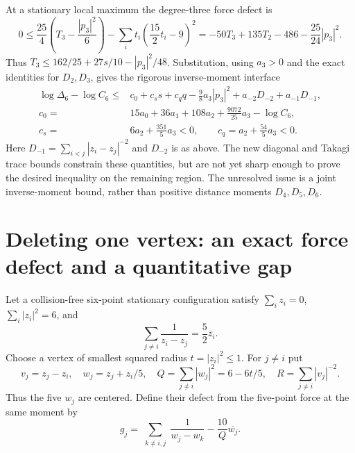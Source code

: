 \documentclass[11pt]{article}
\theoremstyle{remark}
\numberwithin{equation}{section}
\begin{document}
At a stationary local maximum the degree-three force defect is
\[
 0\le\frac{25}{4}\left(T_3-\frac{|p_3|^2}{6}\right)
       -\sum_i t_i\left(\frac{15}{2}t_i-9\right)^2
 =-50T_3+135T_2-486-\frac{25}{24}|p_3|^2.
\]
Thus $T_3\le162/25+27s/10-|p_3|^2/48$.
Substitution, using $a_3>0$ and the exact identities for $D_2,D_3$,
gives the rigorous inverse-moment interface
\begin{align*}
 \log\Delta_6-\log C_6\le{}& c_0+c_s s+c_q q
       -\frac98a_3|p_3|^2+a_{-2}D_{-2}+a_{-1}D_{-1},\\
 c_0={}&15a_0+36a_1+108a_2+\frac{9072}{25}a_3-\log C_6,\\
 c_s={}&6a_2+\frac{351}{5}a_3<0,\qquad
 c_q=a_2+\frac{54}{5}a_3<0.
\end{align*}
Here $D_{-1}=\sum_{i<j}|z_i-z_j|^{-2}$ and $D_{-2}$ is as above.
The new diagonal and Takagi trace bounds constrain these quantities,
but are not yet sharp enough to prove the desired inequality on the
remaining region. The unresolved issue is a joint inverse-moment
bound, rather than positive distance moments $D_4,D_5,D_6$.

\section{Deleting one vertex: an exact force defect and a quantitative gap}
\label{sec:noorigin-six-centroid}

Let a collision-free six-point stationary configuration satisfy
$\sum_i z_i=0$, $\sum_i|z_i|^2=6$, and
\[
 \sum_{j\ne i}\frac1{z_i-z_j}=\frac52\overline{z_i}.
\]
Choose a vertex of smallest squared radius $t=|z_i|^2\le1$.
For $j\ne i$ put
\[
 v_j=z_j-z_i,\quad w_j=z_j+z_i/5,
 \quad Q=\sum_{j\ne i}|w_j|^2=6-6t/5,
 \quad R=\sum_{j\ne i}|v_j|^{-2}.
\]
Thus the five $w_j$ are centered. Define their defect from the
five-point force at the same moment by
\[
 g_j=\sum_{\substack{k\ne i,j}}\frac1{w_j-w_k}
                   -\frac{10}{Q}\overline{w_j}.
\]
\end{document}
